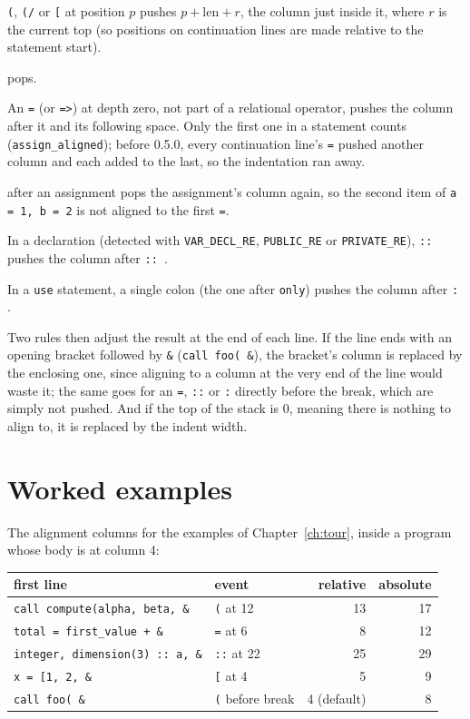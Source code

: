 \documentclass[11pt,a4paper,openany]{book}
\newcommand{\code}[1]{\texttt{\small #1}}
\begin{document}
\begin{description}[font=\sffamily\small\bfseries]
  \item[Opening bracket] \code{(}, \code{(/} or \code{[} at position $p$
    pushes $p + \mathrm{len} + r$, the column just inside it, where $r$ is the
    current top (so positions on continuation lines are made relative to the
    statement start).
  \item[Closing bracket] pops.
  \item[Assignment] An \code{=} (or \code{=>}) at depth zero, not part of a
    relational operator, pushes the column after it and its following space.
    Only the first one in a statement counts (\code{assign\_aligned}); before
    0.5.0, every continuation line's \code{=} pushed another column and each
    added to the last, so the indentation ran away.
  \item[Top-level comma] after an assignment pops the assignment's column
    again, so the second item of \code{a = 1, b = 2} is not aligned to the
    first \code{=}.
  \item[Declaration] In a declaration (detected with \code{VAR\_DECL\_RE},
    \code{PUBLIC\_RE} or \code{PRIVATE\_RE}), \code{::} pushes the column after
    \code{:: }.
  \item[\texttt{use}] In a \code{use} statement, a single colon (the one after
    \code{only}) pushes the column after \code{: }.
\end{description}

Two rules then adjust the result at the end of each line. If the line ends with an
opening bracket followed by \code{\&} (\code{call foo( \&}), the bracket's
column is replaced by the enclosing one, since aligning to a column at the very
end of the line would waste it; the same goes for an \code{=}, \code{::} or
\code{:} directly before the break, which are simply not pushed. And if the
top of the stack is 0, meaning there is nothing to align to, it is replaced by
the indent width.

\section{Worked examples}

The alignment columns for the examples of Chapter~\ref{ch:tour}, inside a
program whose body is at column 4:

\begin{center}
\small
\begin{tabular}{@{}l l r r@{}}
\toprule
first line & event & relative & absolute\\
\midrule
\code{call compute(alpha, beta, \&} & \code{(} at 12 & 13 & 17\\
\code{total = first\_value + \&} & \code{=} at 6 & 8 & 12\\
\code{integer, dimension(3) :: a, \&} & \code{::} at 22 & 25 & 29\\
\code{x = [1, 2, \&} & \code{[} at 4 & 5 & 9\\
\code{call foo( \&} & \code{(} before break & 4 (default) & 8\\
\bottomrule
\end{tabular}
\end{center}
\end{document}
